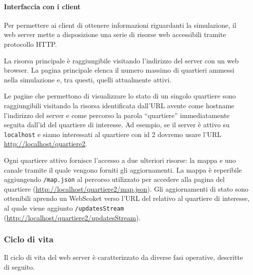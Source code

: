 \paragraph*{Interfaccia con i client}
Per permettere ai client di ottenere informazioni riguardanti la simulazione, il
web server mette a disposizione una serie di risorse web accessibili tramite
protocollo HTTP. 

La risorsa principale è raggiungibile visitando l'indirizzo del server con un
web browser.
La pagina principale elenca il numero massimo di quartieri ammessi nella
simulazione e, tra questi, quelli attualmente attivi.

Le pagine che permettono di visualizzare lo stato di un singolo quartiere sono
raggiungibili visitando la risorsa identificata dall'URL avente come hostname
l'indirizzo del server e come percorso la parola ``quartiere'' immediatamente
seguita dall'id del quartiere di interesse. Ad esempio, se il server è attivo su
\texttt{localhost} e siamo interessati al quartiere con id 2 dovremo usare l'URL
\url{http://localhost/quartiere2}.

Ogni quartiere attivo fornisce l'accesso a due ulteriori risorse: la mappa e uno
canale tramite il quale vengono forniti gli aggiornamenti.
La mappa è reperibile aggiungendo \texttt{/map.json} al percorso utilizzato per
accedere alla pagina del quartiere (\url{http://localhost/quartiere2/map.json}).
Gli aggiornamenti di stato sono ottenibili aprendo un WebScoket verso l'URL del
relativo al quartiere di interesse, al quale viene aggiunto
\texttt{/updatesStream} (\url{http://localhost/quartiere2/updatesStream}).

\subsubsection{Ciclo di vita}
Il ciclo di vita del web server è caratterizzato da diverse fasi operative,
descritte di seguito.

